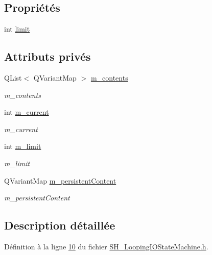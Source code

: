 \subsection*{Propriétés}
\begin{DoxyCompactItemize}
\item 
int \hyperlink{classSh__LoopingInOutStateMachine_aea47cac4b5f895ba85604cdce1160ccd}{limit}
\end{DoxyCompactItemize}
\subsection*{Attributs privés}
\begin{DoxyCompactItemize}
\item 
Q\-List$<$ Q\-Variant\-Map $>$ \hyperlink{classSh__LoopingInOutStateMachine_a267e7cbcb3d6a137e2a4e1f93fb57e68}{m\-\_\-contents}
\begin{DoxyCompactList}\small\item\em m\-\_\-contents \end{DoxyCompactList}\item 
int \hyperlink{classSh__LoopingInOutStateMachine_a6bcf7bcfe684dbd4d11ed327948e161b}{m\-\_\-current}
\begin{DoxyCompactList}\small\item\em m\-\_\-current \end{DoxyCompactList}\item 
int \hyperlink{classSh__LoopingInOutStateMachine_a320ece6cf74c2667c70059b9421117fb}{m\-\_\-limit}
\begin{DoxyCompactList}\small\item\em m\-\_\-limit \end{DoxyCompactList}\item 
Q\-Variant\-Map \hyperlink{classSh__LoopingInOutStateMachine_ad9c0db5b057a6ba340ffcaddce60d6da}{m\-\_\-persistent\-Content}
\begin{DoxyCompactList}\small\item\em m\-\_\-persistent\-Content \end{DoxyCompactList}\end{DoxyCompactItemize}


\subsection{Description détaillée}


Définition à la ligne \hyperlink{SH__LoopingIOStateMachine_8h_source_l00010}{10} du fichier \hyperlink{SH__LoopingIOStateMachine_8h_source}{S\-H\-\_\-\-Looping\-I\-O\-State\-Machine.\-h}.



